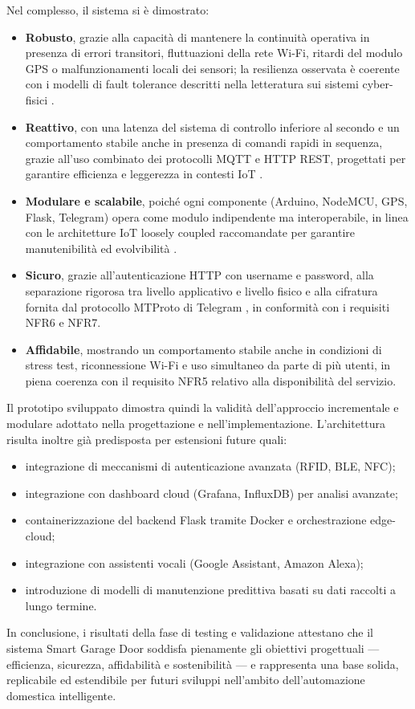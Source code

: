Nel complesso, il sistema si è dimostrato:
\begin{itemize}
    \item \textbf{Robusto}, grazie alla capacità di mantenere la continuità operativa in presenza di errori transitori, fluttuazioni della rete Wi-Fi, ritardi del modulo GPS o malfunzionamenti locali dei sensori; la resilienza osservata è coerente con i modelli di fault tolerance descritti nella letteratura sui sistemi cyber-fisici \cite{Avizienis2004, Chung2020}.
    \item \textbf{Reattivo}, con una latenza del sistema di controllo inferiore al secondo e un comportamento stabile anche in presenza di comandi rapidi in sequenza, grazie all’uso combinato dei protocolli MQTT e HTTP REST, progettati per garantire efficienza e leggerezza in contesti IoT \cite{Amaral2018}.
    \item \textbf{Modulare e scalabile}, poiché ogni componente (Arduino, NodeMCU, GPS, Flask, Telegram) opera come modulo indipendente ma interoperabile, in linea con le architetture IoT loosely coupled raccomandate per garantire manutenibilità ed evolvibilità \cite{Zanella2014}.
    \item \textbf{Sicuro}, grazie all'autenticazione HTTP con username e password, alla separazione rigorosa tra livello applicativo e livello fisico e alla cifratura fornita dal protocollo MTProto di Telegram \cite{Kuznetsov2018}, in conformità con i requisiti NFR6 e NFR7.
    \item \textbf{Affidabile}, mostrando un comportamento stabile anche in condizioni di stress test, riconnessione Wi-Fi e uso simultaneo da parte di più utenti, in piena coerenza con il requisito NFR5 relativo alla disponibilità del servizio.
\end{itemize}

Il prototipo sviluppato dimostra quindi la validità dell'approccio incrementale e modulare adottato nella progettazione e nell'implementazione. L'architettura risulta inoltre già predisposta per estensioni future quali:
\begin{itemize}
    \item integrazione di meccanismi di autenticazione avanzata (RFID, BLE, NFC);
    \item integrazione con dashboard cloud (Grafana, InfluxDB) per analisi avanzate;
    \item containerizzazione del backend Flask tramite Docker e orchestrazione edge-cloud;
    \item integrazione con assistenti vocali (Google Assistant, Amazon Alexa);
    \item introduzione di modelli di manutenzione predittiva basati su dati raccolti a lungo termine.
\end{itemize}

In conclusione, i risultati della fase di testing e validazione attestano che il sistema Smart Garage Door soddisfa pienamente gli obiettivi progettuali — efficienza, sicurezza, affidabilità e sostenibilità — e rappresenta una base solida, replicabile ed estendibile per futuri sviluppi nell'ambito dell'automazione domestica intelligente.